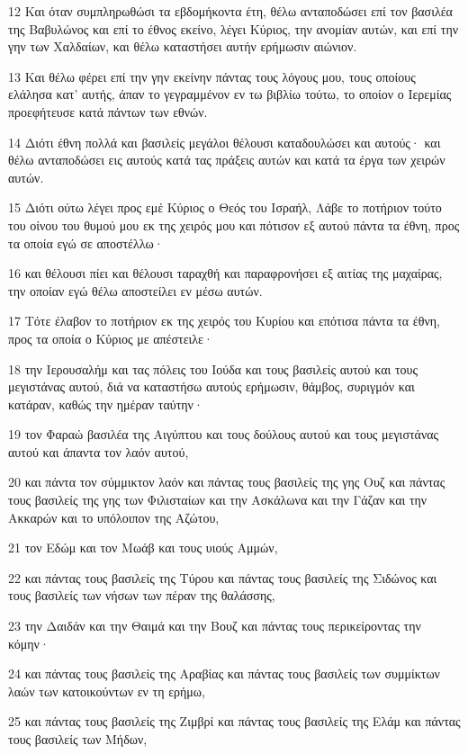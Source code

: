 \par 12 Και όταν συμπληρωθώσι τα εβδομήκοντα έτη, θέλω ανταποδώσει επί τον βασιλέα της Βαβυλώνος και επί το έθνος εκείνο, λέγει Κύριος, την ανομίαν αυτών, και επί την γην των Χαλδαίων, και θέλω καταστήσει αυτήν ερήμωσιν αιώνιον.
\par 13 Και θέλω φέρει επί την γην εκείνην πάντας τους λόγους μου, τους οποίους ελάλησα κατ' αυτής, άπαν το γεγραμμένον εν τω βιβλίω τούτω, το οποίον ο Ιερεμίας προεφήτευσε κατά πάντων των εθνών.
\par 14 Διότι έθνη πολλά και βασιλείς μεγάλοι θέλουσι καταδουλώσει και αυτούς· και θέλω ανταποδώσει εις αυτούς κατά τας πράξεις αυτών και κατά τα έργα των χειρών αυτών.
\par 15 Διότι ούτω λέγει προς εμέ Κύριος ο Θεός του Ισραήλ, Λάβε το ποτήριον τούτο του οίνου του θυμού μου εκ της χειρός μου και πότισον εξ αυτού πάντα τα έθνη, προς τα οποία εγώ σε αποστέλλω·
\par 16 και θέλουσι πίει και θέλουσι ταραχθή και παραφρονήσει εξ αιτίας της μαχαίρας, την οποίαν εγώ θέλω αποστείλει εν μέσω αυτών.
\par 17 Τότε έλαβον το ποτήριον εκ της χειρός του Κυρίου και επότισα πάντα τα έθνη, προς τα οποία ο Κύριος με απέστειλε·
\par 18 την Ιερουσαλήμ και τας πόλεις του Ιούδα και τους βασιλείς αυτού και τους μεγιστάνας αυτού, διά να καταστήσω αυτούς ερήμωσιν, θάμβος, συριγμόν και κατάραν, καθώς την ημέραν ταύτην·
\par 19 τον Φαραώ βασιλέα της Αιγύπτου και τους δούλους αυτού και τους μεγιστάνας αυτού και άπαντα τον λαόν αυτού,
\par 20 και πάντα τον σύμμικτον λαόν και πάντας τους βασιλείς της γης Ουζ και πάντας τους βασιλείς της γης των Φιλισταίων και την Ασκάλωνα και την Γάζαν και την Ακκαρών και το υπόλοιπον της Αζώτου,
\par 21 τον Εδώμ και τον Μωάβ και τους υιούς Αμμών,
\par 22 και πάντας τους βασιλείς της Τύρου και πάντας τους βασιλείς της Σιδώνος και τους βασιλείς των νήσων των πέραν της θαλάσσης,
\par 23 την Δαιδάν και την Θαιμά και την Βουζ και πάντας τους περικείροντας την κόμην·
\par 24 και πάντας τους βασιλείς της Αραβίας και πάντας τους βασιλείς των συμμίκτων λαών των κατοικούντων εν τη ερήμω,
\par 25 και πάντας τους βασιλείς της Ζιμβρί και πάντας τους βασιλείς της Ελάμ και πάντας τους βασιλείς των Μήδων,
